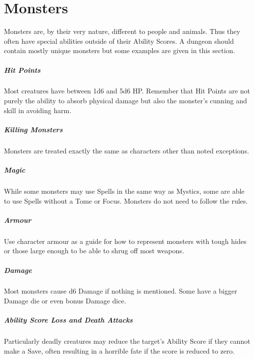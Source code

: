 \documentclass[itdr]{subfiles}
\begin{document}
\cleartoleftpage

\chapter{Monsters}
\label{ch:monsters}

Monsters are, by their very nature, different to people and animals. Thus they often have special abilities outside of their Ability Scores. A dungeon should contain mostly unique monsters but some examples are given in this section.

\vfill
{}
\paragraph{Hit Points}
Most creatures have between 1d6 and 5d6 HP. Remember that Hit Points are not purely the ability to absorb physical damage but also the monster's cunning and skill in avoiding harm.

\vfill
\paragraph{Killing Monsters}
Monsters are treated exactly the same as characters other than noted exceptions.

\vfill
{}
\paragraph{Magic}
While some monsters may use Spells in the same way as Mystics, some are able to use Spells without a Tome or Focus. Monsters do not need to follow the rules.

\vfill
{}
\paragraph{Armour}
Use character armour as a guide for how to represent monsters with tough hides or those large enough to be able to shrug off most weapons.

\vfill
{}
\paragraph{Damage}
Most monsters cause d6 Damage if nothing is mentioned. Some have a bigger Damage die or even bonus Damage dice.

\vfill
{}
\paragraph{Ability Score Loss and Death Attacks}
Particularly deadly creatures may reduce the target's Ability Score if they cannot make a Save, often resulting in a horrible fate if the score is reduced to zero.
\end{document}
